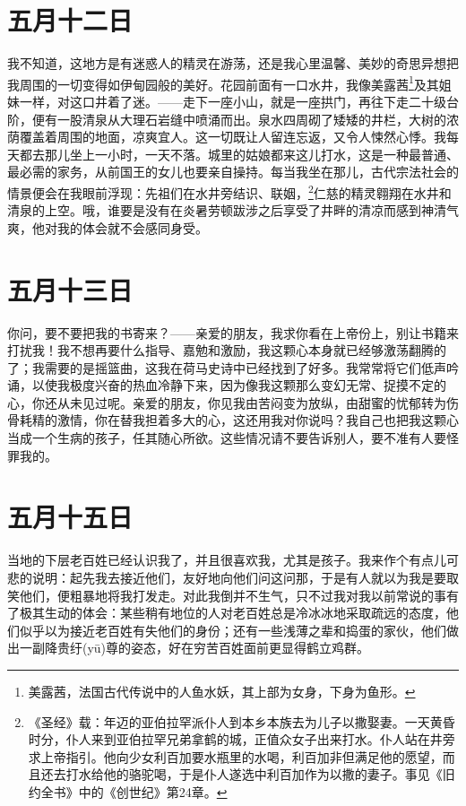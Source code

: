 \documentclass[12pt,oneside]{book}
\begin{document}
\chapter{五月十二日}
\label{sec-2-3}
我不知道，这地方是有迷惑人的精灵在游荡，还是我心里温馨、美妙的奇思异想把我周围的一切变得如伊甸园般的美好。花园前面有一口水井，我像美露茜\footnote{美露茜，法国古代传说中的人鱼水妖，其上部为女身，下身为鱼形。}及其姐妹一样，对这口井着了迷。——走下一座小山，就是一座拱门，再往下走二十级台阶，便有一股清泉从大理石岩缝中喷涌而出。泉水四周砌了矮矮的井栏，大树的浓荫覆盖着周围的地面，凉爽宜人。这一切既让人留连忘返，又令人悚然心悸。我每天都去那儿坐上一小时，一天不落。城里的姑娘都来这儿打水，这是一种最普通、最必需的家务，从前国王的女儿也要亲自操持。每当我坐在那儿，古代宗法社会的情景便会在我眼前浮现：先祖们在水井旁结识、联姻，\footnote{《圣经》载：年迈的亚伯拉罕派仆人到本乡本族去为儿子以撒娶妻。一天黄昏时分，仆人来到亚伯拉罕兄弟拿鹤的城，正值众女子出来打水。仆人站在井旁求上帝指引。他向少女利百加要水瓶里的水喝，利百加非但满足他的愿望，而且还去打水给他的骆驼喝，于是仆人遂选中利百加作为以撒的妻子。事见《旧约全书》中的《创世纪》第24章。}仁慈的精灵翱翔在水井和清泉的上空。哦，谁要是没有在炎暑劳顿跋涉之后享受了井畔的清凉而感到神清气爽，他对我的体会就不会感同身受。


\chapter{五月十三日}
\label{sec-2-4}
你问，要不要把我的书寄来？——亲爱的朋友，我求你看在上帝份上，别让书籍来打扰我！我不想再要什么指导、嘉勉和激励，我这颗心本身就已经够激荡翻腾的了；我需要的是摇篮曲，这我在荷马史诗中已经找到了好多。我常常将它们低声吟诵，以使我极度兴奋的热血冷静下来，因为像我这颗那么变幻无常、捉摸不定的心，你还从未见过呢。亲爱的朋友，你见我由苦闷变为放纵，由甜蜜的忧郁转为伤骨耗精的激情，你在替我担着多大的心，这还用我对你说吗？我自己也把我这颗心当成一个生病的孩子，任其随心所欲。这些情况请不要告诉别人，要不准有人要怪罪我的。
　　
\chapter{五月十五日}
\label{sec-2-5}
当地的下层老百姓已经认识我了，并且很喜欢我，尤其是孩子。我来作个有点儿可悲的说明：起先我去接近他们，友好地向他们问这问那，于是有人就以为我是要取笑他们，便粗暴地将我打发走。对此我倒并不生气，只不过我对我以前常说的事有了极其生动的体会：某些稍有地位的人对老百姓总是冷冰冰地采取疏远的态度，他们似乎以为接近老百姓有失他们的身份；还有一些浅薄之辈和捣蛋的家伙，他们做出一副降贵纡(yū)尊的姿态，好在穷苦百姓面前更显得鹤立鸡群。
\end{document}
